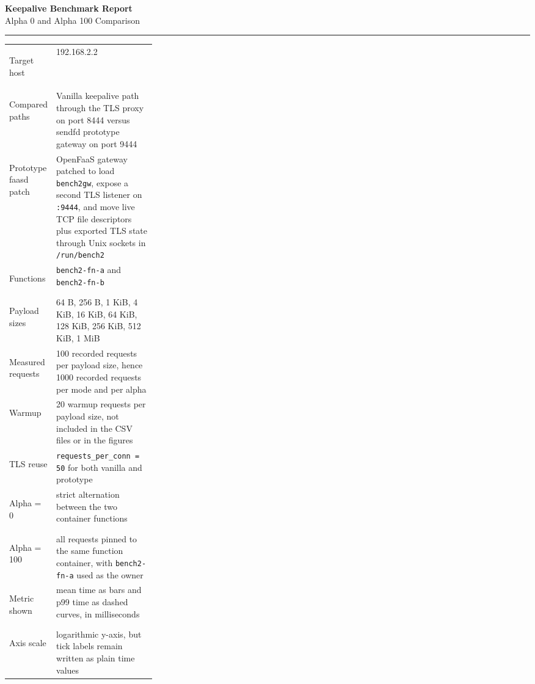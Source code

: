 \documentclass[10pt,a4paper]{article}
\begin{document}
\color{Ink}

\begin{center}
    {\LARGE\bfseries Keepalive Benchmark Report}\\[0.20em]
    {\large Alpha 0 and Alpha 100 Comparison}\\[0.45em]
    {\color{Accent}\rule{0.92\linewidth}{1.2pt}}
\end{center}

\begin{table}[h]
\centering
\small
\renewcommand{\arraystretch}{1.12}
\begin{tabularx}{\linewidth}{>{\bfseries\raggedright\arraybackslash}p{0.28\linewidth} X}
Target host & 192.168.2.2 \\
Compared paths & Vanilla keepalive path through the TLS proxy on port 8444 versus sendfd prototype gateway on port 9444 \\
Prototype faasd patch & OpenFaaS gateway patched to load \texttt{bench2gw}, expose a second TLS listener on \texttt{:9444}, and move live TCP file descriptors plus exported TLS state through Unix sockets in \texttt{/run/bench2} \\
Functions & \texttt{bench2-fn-a} and \texttt{bench2-fn-b} \\
Payload sizes & 64 B, 256 B, 1 KiB, 4 KiB, 16 KiB, 64 KiB, 128 KiB, 256 KiB, 512 KiB, 1 MiB \\
Measured requests & 100 recorded requests per payload size, hence 1000 recorded requests per mode and per alpha \\
Warmup & 20 warmup requests per payload size, not included in the CSV files or in the figures \\
TLS reuse & \texttt{requests\_per\_conn = 50} for both vanilla and prototype \\
Alpha = 0 & strict alternation between the two container functions \\
Alpha = 100 & all requests pinned to the same function container, with \texttt{bench2-fn-a} used as the owner \\
Metric shown & mean time as bars and p99 time as dashed curves, in milliseconds \\
Axis scale & logarithmic y-axis, but tick labels remain written as plain time values \\
\end{tabularx}
\end{table}
\end{document}
